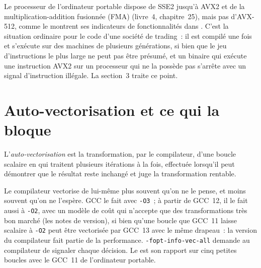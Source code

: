 Le processeur de l'ordinateur portable dispose de SSE2 jusqu'à AVX2 et de la multiplication-addition fusionnée (FMA) (livre~4, chapitre~25), mais pas d'AVX-512, comme le montrent ses
indicateurs de fonctionnalités dans . C'est la situation ordinaire pour le code d'une société de trading~: il est compilé une fois et
s'exécute sur des machines de plusieurs générations, si bien que le jeu d'instructions le plus large ne peut pas être présumé, et un binaire qui exécute une
instruction AVX2 sur un processeur qui ne la possède pas s'arrête avec un signal d'instruction illégale. La section~3 traite ce point.

\section{Auto-vectorisation et ce qui la bloque}

\begin{definition}\label{def:ll:vector-instructions-and-data-parallel-code:auto}
L'\emph{auto-vectorisation} est la transformation, par le compilateur, d'une boucle scalaire en 
qui traitent plusieurs itérations à la fois, effectuée lorsqu'il peut démontrer que le résultat reste inchangé et juge la
transformation rentable.
\end{definition}

Le compilateur vectorise de lui-même plus souvent qu'on ne le pense, et moins souvent qu'on ne l'espère. GCC le fait avec
\texttt{-O3}~; à partir de GCC~12, il le fait aussi à \texttt{-O2}, avec un modèle de coût qui n'accepte que des transformations très bon marché
(les notes de version), si bien qu'une boucle que GCC~11 laisse scalaire à \texttt{-O2} peut être vectorisée par GCC~13 avec le
même drapeau~: la version du compilateur fait partie de la performance. \texttt{-fopt-info-vec-all} demande au compilateur de signaler chaque décision.
Le  est son rapport sur cinq petites boucles avec le GCC~11 de l'ordinateur portable.

\label{lst:ll:vector-instructions-and-data-parallel-code:report}

